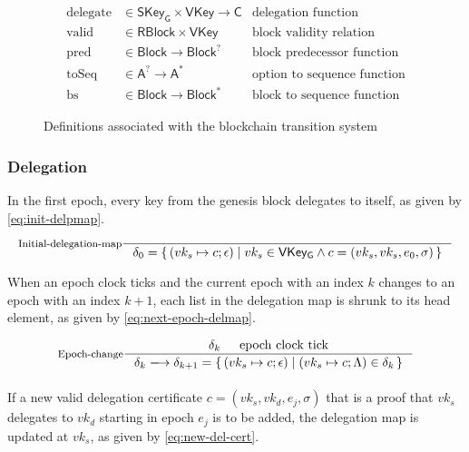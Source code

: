 \documentclass[11pt,a4paper]{article}
\newcommand\Set[2]{\{\,#1\mid#2\,\}}
\newcommand{\type}[1]{\mathsf{#1}}
\newcommand{\trans}[2]{\xlongrightarrow[\textsc{#1}]{#2}}
\newcommand{\seqof}[1]{#1^{*}}
\newcommand{\RBlock}{\type{RBlock}}
\newcommand{\Block}{\type{Block}}
\newcommand{\HCert}{\type{C}}
\newcommand{\SKeyGen}{\type{SKey_G}}
\newcommand{\VKey}{\type{VKey}}
\newcommand{\VKeyGen}{\type{VKey_G}}
\newcommand{\delegatename}{delegate}
\newcommand{\validname}{valid}
\newcommand{\predbname}{pred} %
\newcommand{\toseqname}{toSeq} %
\newcommand{\predbseqname}{bs} %
\newcommand{\delmap}{\delta}
\newcommand{\totalf}{\to}
\newcommand{\partialf}{\mapsto}
\begin{document}
\begin{figure}[h]
\begin{align*}
    \text{\delegatename} & \in \SKeyGen \times \VKey \totalf \HCert
      & \text{delegation function}\\
    \text{\validname} & \in \RBlock \times \VKey
      & \text{block validity relation}\\
    \text{\predbname} & \in \Block \totalf \Block^?
      & \text{block predecessor function} \\
    \text{\toseqname} & \in \type{A}^? \totalf \seqof{\type{A}}
      & \text{option to sequence function} \\
    \text{\predbseqname} & \in \Block \totalf \seqof{\Block}
      & \text{block to sequence function}
  \end{align*}
  \caption{Definitions associated with the blockchain transition system}
  \label{fig:state-trans-abstract}
\end{figure}

\subsubsection{Delegation}
\label{sec:delegation-properties}

In the first epoch, every key from the genesis block delegates to itself, as given by \eqref{eq:init-delpmap}.

\begin{equation}
  \label{eq:init-delpmap}
  \inference[Initial-delegation-map]
  {}
  { \delmap_0 = \Set{(vk_s \partialf c; \epsilon)}{vk_s \in \VKeyGen \wedge c = (vk_s, vk_s, e_0, \sigma)}}
\end{equation}


When an epoch clock ticks and the current epoch with an index $k$ changes to
an epoch with an index $k+1$, each list in the delegation map is shrunk to its
head element, as given by \eqref{eq:next-epoch-delmap}.

\begin{equation}
  \label{eq:next-epoch-delmap}
  \inference[Epoch-change]
  {\delmap_k & \text{epoch clock tick}}
  {\delmap_k \trans{}{} {\delmap_{k+1} = \Set{(vk_s \partialf c; \epsilon)}{(vk_s \partialf c; \Lambda) \in \delmap_k}}}
\end{equation}


If a new valid delegation certificate $c = (vk_s, vk_d, e_j, \sigma)$ that is
a proof that $vk_s$ delegates to $vk_d$ starting in epoch $e_j$ is to be
added, the delegation map is updated at $vk_s$, as given by
\eqref{eq:new-del-cert}.
\end{document}
